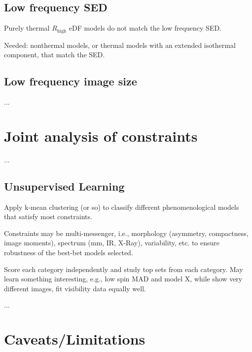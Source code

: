 \documentclass[twocolumn,tighten,dvipsnames]{aastex63}
\newcommand\Rh{R_\mathrm{high}}
\newcommand\<{{\langle}}
\renewcommand\>{{\rangle}} %
\begin{document}
\subsection{Low frequency SED}
\label{sec:lfconst}

Purely thermal $\Rh$ eDF models do not match the low frequency SED.

Needed: nonthermal models, or thermal models with an extended isothermal component, that match the SED.

\subsection{Low frequency image size}
\label{sec:lfsizeconst}

...

\section{Joint analysis of constraints}
\label{sec:allconst}

...

\subsection{Unsupervised Learning}
\label{sec:ml}

Apply k-mean clustering (or so) to classify different phenomenological models that satisfy most constraints.

Constraints may be multi-messenger, i.e., morphology (asymmetry, compactness, image moments), spectrum (mm, IR, X-Ray), variability, etc. to ensure robustness of the best-bet models selected.

Score each category independently and study top sets from each category.  May learn something interesting, e.g., low spin MAD and model X, while show very different images, fit visibility data equally well.

...

\section{Caveats/Limitations}
\label{sec:caveats}
\end{document}
